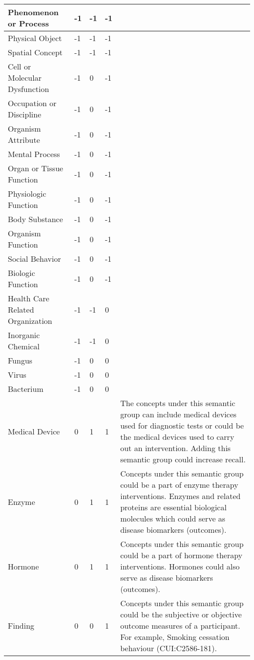 \documentclass[10.7pt,]{article}
\begin{document}
\begin{longtable}{|l|p{0.3cm}|p{0.3cm}|p{0.3cm}|p{7.9cm}|}
        Phenomenon or Process & -1 & -1 & -1 & ~ \\ \hline
        Physical Object & -1 & -1 & -1 & ~ \\ \hline
        Spatial Concept & -1 & -1 & -1 & ~ \\ \hline
        Cell or Molecular Dysfunction & -1 & 0 & -1 & ~ \\ \hline
        Occupation or Discipline & -1 & 0 & -1 & ~ \\ \hline
        Organism Attribute & -1 & 0 & -1 & ~ \\ \hline
        Mental Process & -1 & 0 & -1 & ~ \\ \hline
        Organ or Tissue Function & -1 & 0 & -1 & ~ \\ \hline
        Physiologic Function & -1 & 0 & -1 & ~ \\ \hline
        Body Substance & -1 & 0 & -1 & ~ \\ \hline
        Organism Function & -1 & 0 & -1 & ~ \\ \hline
        Social Behavior & -1 & 0 & -1 & ~ \\ \hline
        Biologic Function & -1 & 0 & -1 & ~ \\ \hline
        Health Care Related Organization & -1 & -1 & 0 & ~ \\ \hline
        Inorganic Chemical & -1 & -1 & 0 & ~ \\ \hline
        Fungus & -1 & 0 & 0 & ~ \\ \hline
        Virus & -1 & 0 & 0 & ~ \\ \hline
        Bacterium & -1 & 0 & 0 & ~ \\ \hline
        Medical Device & 0 & 1 & 1 & The concepts under this semantic group can include medical devices used for diagnostic tests or could be the medical devices used to carry out an intervention. Adding this semantic group could increase recall. \\ \hline
        Enzyme & 0 & 1 & 1 & Concepts under this semantic group could be a part of enzyme therapy interventions. Enzymes and related proteins are essential biological molecules which could serve as disease biomarkers (outcomes). \\ \hline
        Hormone & 0 & 1 & 1 & Concepts under this semantic group could be a part of hormone therapy interventions. Hormones could also serve as disease biomarkers (outcomes). \\ \hline
        Finding & 0 & 0 & 1 & Concepts under this semantic group could be the subjective or objective outcome measures of a participant. For example, Smoking cessation behaviour (CUI:C2586-181). \\ \hline

\end{longtable}
\end{document}
